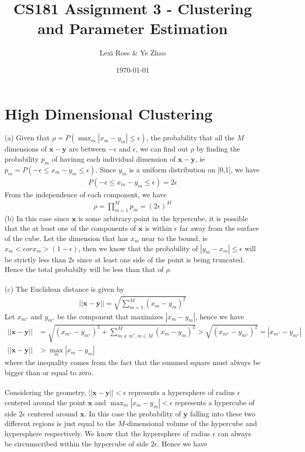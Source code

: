 \documentclass[11pt]{article}
\title{\bf CS181 Assignment 3 - Clustering and Parameter Estimation}
\date{\today}
\author{Lexi Ross \& Ye Zhao}
\begin{document}
\maketitle
\section{High Dimensional Clustering}
(a) Given that $\rho=P(\max_m|x_m-y_m|\leq \epsilon)$, the probability that all the $M$ dimensions of $\mathbf{x} − \mathbf{y}$ are between $-\epsilon$ and $\epsilon$, we can find out $\rho$ by finding the probability $p_m$ of havinng each individual dimension of $\mathbf{x} − \mathbf{y}$, ie $p_m = P(−\epsilon \leq x_m − y_m \leq \epsilon)$. Since $y_m$ is a uniform distribution on [0,1], we have
\begin{align}
P(-\epsilon\leq x_m - y_m \leq\epsilon)=2\epsilon
\end{align}
From the independence of each component, we have
\begin{align}
\rho =\prod_{m=1}^Mp_m=(2\epsilon)^M
\end{align}
(b) In this case since $\mathbf{x}$ is some arbitrary point in the hypercube, it is possible that the at least one of the components of $\mathbf{x}$ is within $\epsilon$ far away from the surface of the cube. Let the dimension that has $x_m$ near to the bound, ie $x_m < \epsilon or x_m > (1 − \epsilon)$, then we know that the probability of $|y_m − x_m| \leq \epsilon$ will be strictly less than $2\epsilon$ since at least one side of the point is being truncated. Hence the total probabilty will be less than that of $\rho$.
\\
\\
(c) The Euclidean distance is given by
\begin{align}
||\mathbf{x}-\mathbf{y}||=\sqrt{\sum_{m=1}^M(x_m-y_m)^2}
\end{align}
Let $x_{m^∗}$ and $y_{m^∗}$ be the component that maximizes $|x_m − y_m|$, hence we have
\begin{align}
||\mathbf{x}-\mathbf{y}||&=\sqrt{(x_{m^∗}-y_{m^∗})^2+\sum_{m\neq m^*,m\in M}^M(x_m-y_m)^2}
>\sqrt{(x_{m^∗}-y_{m^∗})^2}=|x_{m^∗}-y_{m^∗}|\\
||\mathbf{x}-\mathbf{y}||&>\max_m|x_m-y_m|
\end{align}
where the inequality comes from the fact that the summed square must always be bigger than or equal to zero.
\\
\\
Considering the geometry, $||\mathbf{x}-\mathbf{y}||<\epsilon$ represents a hypersphere of radius $\epsilon$ centered around the point $\mathbf{x}$ and $\max_m|x_m-y_m|<\epsilon$ represents a hypercube of side $2\epsilon$ centered around $\mathbf{x}$. In this case the probability of $\mathbf{y}$ falling into these two different regions is just equal to the $M$-dimensional volume of the hypercube and hypersphere respectively. We know that the hypersphere of radius $\epsilon$ can always be circumscribed within the hypercube of side $2\epsilon$. Hence we have
\end{document}
